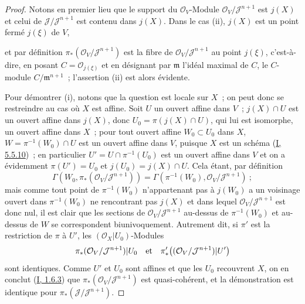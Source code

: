 \begin{proof}
Notons en premier lieu que le support du $\mathcal{O}_V$-Module
$\mathcal{O}_V/\mathcal{J}^{n+1}$ est $j(X)$ et celui de
$\mathcal{J}/\mathcal{J}^{n+1}$ est contenu dans $j(X)$. Dans le cas (ii),
$j(X)$ est un point fermé $j(\xi)$ de $V$,

et par définition $\pi_*(\mathcal{O}_V/\mathcal{J}^{n+1})$ est la fibre de
$\mathcal{O}_V/\mathcal{J}^{n+1}$ au point $j(\xi)$, c'est-à-dire, en posant
$C=\mathcal{O}_{j(\xi)}$ et en désignant par $\mathfrak{m}$ l'idéal maximal
de $C$, le $C$-module $C/\mathfrak{m}^{n+1}$~; l'assertion (ii) est alors
évidente.

Pour démontrer (i), notons que la question est locale sur $X$~; on peut donc
se restreindre au cas où $X$ est affine. Soit $U$ un ouvert affine dans $V$~;
$j(X)\cap U$ est un ouvert affine dans $j(X)$, donc
$U_0=\pi(j(X)\cap U)$, qui lui est isomorphe, un ouvert affine dans $X$~;
pour tout ouvert affine $W_0\subset U_0$ dans $X$,
$W=\pi^{-1}(W_0)\cap U$ est un ouvert affine dans $V$, puisque $X$ est un
schéma (\hyperref[I.5.5.10-fr]{I, 5.5.10})~; en particulier
$U'=U\cap\pi^{-1}(U_0)$ est un ouvert affine dans $V$ et on a évidemment
$\pi(U')=U_0$ et $j(U_0)=j(X)\cap U$. Cela étant, par définition
\[
  \Gamma(W_0,\pi_*(\mathcal{O}_V/\mathcal{J}^{n+1}))
  =\Gamma(\pi^{-1}(W_0),\mathcal{O}_V/\mathcal{J}^{n+1})~;
\]
mais comme tout point de $\pi^{-1}(W_0)$ n'appartenant pas à $j(W_0)$ a un
voisinage ouvert dans $\pi^{-1}(W_0)$ ne rencontrant pas $j(X)$ et dans
lequel $\mathcal{O}_V/\mathcal{J}^{n+1}$ est donc nul, il est clair que les
sections de $\mathcal{O}_V/\mathcal{J}^{n+1}$ au-dessus de $\pi^{-1}(W_0)$ et
au-dessus de $W$ se correspondent biunivoquement. Autrement dit, si $\pi'$ est
la restriction de $\pi$ à $U'$, les $(\mathcal{O}_X|U_0)$-Modules
\[
  \pi_*(\mathcal{O}_V/\mathcal{J}^{n+1})|U_0
  \quad\hbox{et}\quad
  \pi'_*\bigl((\mathcal{O}_V/\mathcal{J}^{n+1})|U'\bigr)
\]
sont identiques. Comme $U'$ et $U_0$ sont affines et que les $U_0$ recouvrent
$X$, on en conclut (\hyperref[I.1.6.3-fr]{I, 1.6.3}) que
$\pi_*(\mathcal{O}_V/\mathcal{J}^{n+1})$ est quasi-cohérent, et la
démonstration est identique pour
$\pi_*(\mathcal{J}/\mathcal{J}^{n+1})$.


\end{proof}
